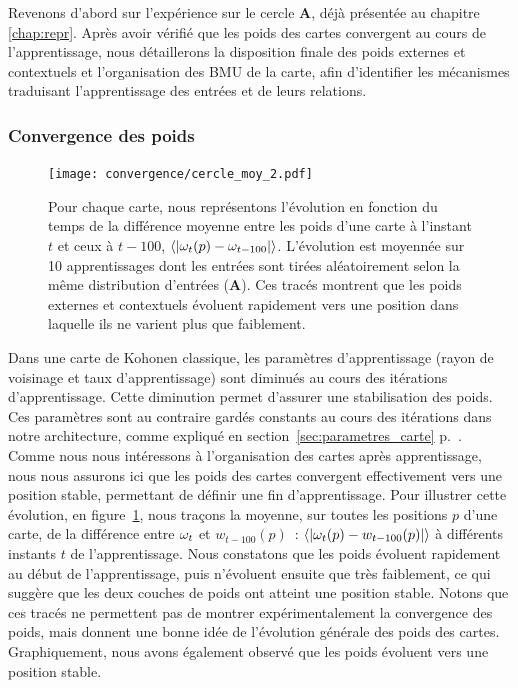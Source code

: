 \documentclass[../main]{subfiles}
\begin{document}
Revenons d'abord sur l'expérience sur le cercle \textbf{A}, déjà présentée au chapitre \ref{chap:repr}. 
Après avoir vérifié que les poids des cartes convergent au cours de l'apprentissage, nous détaillerons la disposition finale des poids externes et contextuels et l'organisation des BMU de la carte, afin d'identifier les mécanismes traduisant l'apprentissage des entrées et de leurs relations.

\subsubsection{Convergence des poids}

\begin{figure}
	\texttt{[image: convergence/cercle\_moy\_2.pdf]}
	\vspace{-0.5cm}
	\caption{Pour chaque carte, nous représentons l'évolution en fonction du temps de la différence moyenne entre les poids d'une carte à l'instant $t$ et ceux à $t-100$, $\langle|\omega_t(p) - \omega_{t-100}|\rangle$.
	L'évolution est moyennée sur 10 apprentissages dont les entrées sont tirées aléatoirement selon la même distribution d'entrées (\textbf{A}).
	Ces tracés montrent que les poids externes et contextuels évoluent rapidement vers une position dans laquelle ils ne varient plus que faiblement.\label{fig:conv}}
\end{figure}

Dans une carte de Kohonen classique, les paramètres d'apprentissage (rayon de voisinage et taux d'apprentissage) sont diminués au cours des itérations d'apprentissage. Cette diminution permet d'assurer une stabilisation des poids. Ces paramètres sont au contraire gardés constants au cours des itérations dans notre architecture, comme expliqué en section~\ref{sec:parametres_carte} p.~\pageref{sec:parametres_carte}.
Comme nous nous intéressons à l'organisation des cartes après apprentissage, nous nous assurons ici que les poids des cartes convergent effectivement vers une position stable, permettant de définir une fin d'apprentissage.
Pour illustrer cette évolution, en figure~\ref{fig:conv}, nous traçons la moyenne, sur toutes les positions $p$ d'une carte, de la différence entre $\omega_t$ et $w_{t-100}(p)$~: $\langle | \omega_t(p) - w_{t-100}(p)| \rangle $ à différents instants $t$ de l'apprentissage. Nous constatons que les poids évoluent rapidement au début de l'apprentissage, puis n'évoluent ensuite que très faiblement, ce qui suggère que les deux couches de poids ont atteint une position stable. Notons que ces tracés ne permettent pas de montrer expérimentalement la convergence des poids, mais donnent une bonne idée de l'évolution générale des poids des cartes.
Graphiquement, nous avons également observé que les poids évoluent vers une position stable.
\end{document}

